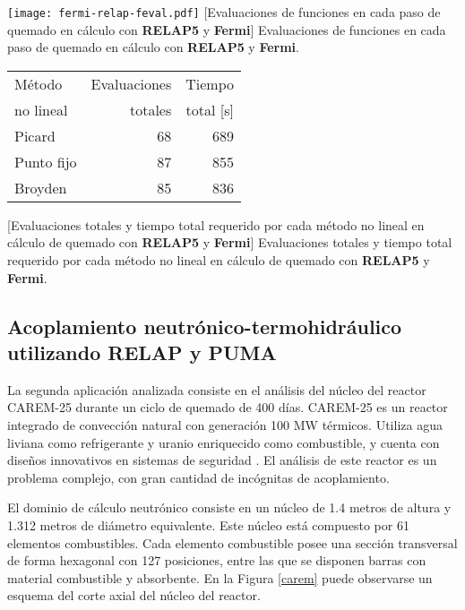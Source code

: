 \begin{minipage}{\textwidth}
\begin{minipage}[b]{0.49\textwidth}
  \centering
  \texttt{[image: fermi-relap-feval.pdf]}
  \label{fig-relap-fermi}
  \captionsetup{width=0.8\textwidth}
  [Evaluaciones de funciones en cada paso de quemado en cálculo con \textbf{RELAP5} y \textbf{Fermi}]
  {Evaluaciones de funciones en cada paso de quemado en cálculo con \textbf{RELAP5} y \textbf{Fermi}.}
\end{minipage}
\hfill
\begin{minipage}[b]{0.49\textwidth}
  \centering
  \begin{tabular}{ l r r } \hline
      Método & Evaluaciones & Tiempo \\
      no lineal & totales & total [s] \\ \hline %
      Picard & 68 & 689 \\ %
      Punto fijo & 87 & 855  \\ %
      Broyden & 85 & 836 \\ \hline
   \end{tabular}
   \label{tab-relap-fermi}
   \captionsetup{width=0.8\textwidth}
   [Evaluaciones totales y tiempo total requerido por cada método no lineal en cálculo de quemado con \textbf{RELAP5} y \textbf{Fermi}]
   {Evaluaciones totales y tiempo total requerido por cada método no lineal en cálculo de quemado con \textbf{RELAP5} y \textbf{Fermi}.}
  \end{minipage}
\end{minipage}

\subsection*{Acoplamiento neutrónico-termohidráulico utilizando RELAP y PUMA}
\label{3:relap-puma}

La segunda aplicación analizada consiste en el análisis del núcleo del reactor CAREM-25 \cite{carem} durante un ciclo de quemado de 400 días.
CAREM-25 es un reactor integrado de convección natural con generación 100 MW térmicos.
Utiliza agua liviana como refrigerante y uranio enriquecido como combustible, y
cuenta con diseños innovativos en sistemas de seguridad \cite{carem}.
El análisis de este reactor es un problema complejo, con gran cantidad de incógnitas de acoplamiento.

El dominio de cálculo neutrónico consiste en un núcleo de 1.4 metros de altura y 1.312 metros de diámetro equivalente.
Este núcleo está compuesto por 61 elementos combustibles.
Cada elemento combustible posee una sección transversal de forma hexagonal con 127 posiciones, entre las que se disponen barras con material combustible y absorbente.
En la Figura \ref{carem} puede observarse un esquema del corte axial del núcleo del reactor.

